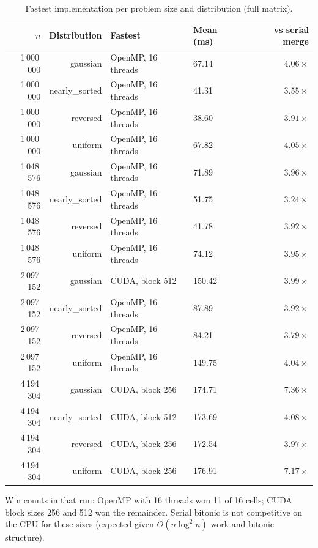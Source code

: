\documentclass[11pt,a4paper]{article}
\begin{document}
\begin{table}[htbp]
  \centering
  \small
  \caption{Fastest implementation per problem size and distribution (full matrix).}
  \begin{tabular}{@{}rrllr@{}}
    \toprule
    $n$ & \multicolumn{1}{c}{Distribution} & Fastest & Mean (ms) & vs serial merge \\
    \midrule
    1\,000\,000 & gaussian & OpenMP, 16 threads & 67.14 & $4.06\times$ \\
    1\,000\,000 & nearly\_sorted & OpenMP, 16 threads & 41.31 & $3.55\times$ \\
    1\,000\,000 & reversed & OpenMP, 16 threads & 38.60 & $3.91\times$ \\
    1\,000\,000 & uniform & OpenMP, 16 threads & 67.82 & $4.05\times$ \\
    1\,048\,576 & gaussian & OpenMP, 16 threads & 71.89 & $3.96\times$ \\
    1\,048\,576 & nearly\_sorted & OpenMP, 16 threads & 51.75 & $3.24\times$ \\
    1\,048\,576 & reversed & OpenMP, 16 threads & 41.78 & $3.92\times$ \\
    1\,048\,576 & uniform & OpenMP, 16 threads & 74.12 & $3.95\times$ \\
    2\,097\,152 & gaussian & CUDA, block 512 & 150.42 & $3.99\times$ \\
    2\,097\,152 & nearly\_sorted & OpenMP, 16 threads & 87.89 & $3.92\times$ \\
    2\,097\,152 & reversed & OpenMP, 16 threads & 84.21 & $3.79\times$ \\
    2\,097\,152 & uniform & OpenMP, 16 threads & 149.75 & $4.04\times$ \\
    4\,194\,304 & gaussian & CUDA, block 256 & 174.71 & $7.36\times$ \\
    4\,194\,304 & nearly\_sorted & CUDA, block 512 & 173.69 & $4.08\times$ \\
    4\,194\,304 & reversed & CUDA, block 256 & 172.54 & $3.97\times$ \\
    4\,194\,304 & uniform & CUDA, block 256 & 176.91 & $7.17\times$ \\
    \bottomrule
  \end{tabular}
\end{table}

Win counts in that run: OpenMP with 16 threads won 11 of 16 cells; CUDA block sizes 256 and 512 won the remainder. Serial bitonic is not competitive on the CPU for these sizes (expected given $O(n \log^2 n)$ work and bitonic structure).
\end{document}
